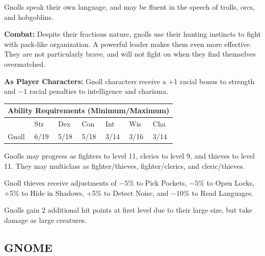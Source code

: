 \begin{multicols}{2}
Gnolls speak their own language, and may be fluent in the speech of trolls, orcs, and hobgoblins.

\textbf{Combat:} Despite their fractious nature, gnolls use their hunting instincts to fight with pack-like organization. A powerful leader makes them even more effective. They are not particularly brave, and will not fight on when they find themselves overmatched.

\textbf{As Player Characters:} Gnoll characters receive a +1 racial bonus to strength and $-1$ racial penalties to intelligence and charisma.

\noindent \begin{minipage}{\columnwidth}

\noindent \begin{tabular}{|p{}|p{}|p{}|p{}|p{}|p{}|p{}|}
\multicolumn{7}{c}{Ability Requirements (Minimum/Maximum)} \\
\hline
	& Str	& Dex	& Con	& Int	& Wis	& Cha	\\
\hline\hline
\rowcolor[gray]{.9}Gnoll	& 6/19	& 5/18	& 5/18	& 3/14	& 3/16	& 3/14	\\
\hline
\end{tabular}

\end{minipage}

Gnolls may progress as fighters to level 11, clerics to level 9, and thieves to level 11. They may multiclass as fighter/thieves, fighter/clerics, and cleric/thieves.

Gnoll thieves receive adjustments of $-5$\% to Pick Pockets, $-5$\% to Open Locks, +5\% to Hide in Shadows, +5\% to Detect Noise, and $-10$\% to Read Languages.

Gnolls gain 2 additional hit points at first level due to their large size, but take damage as large creatures.

\noindent \begin{minipage}{\columnwidth}

\vspace{1em}

\subsection{GNOME}


\end{minipage}
\end{multicols}
